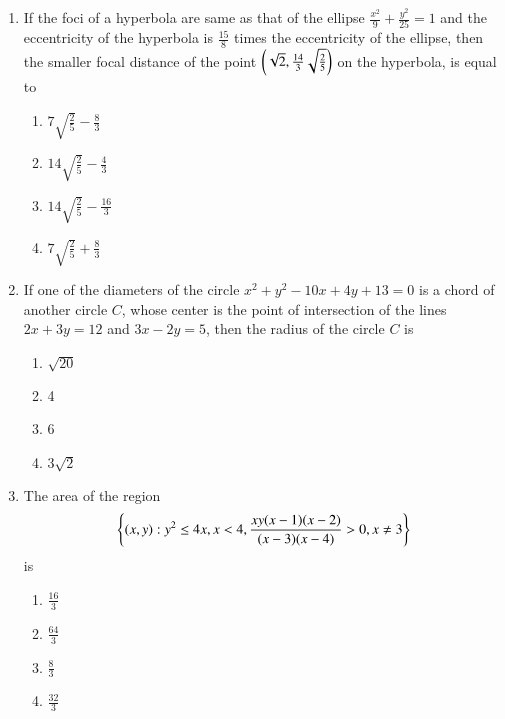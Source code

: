 \documentclass[journal]{IEEEtran}
\begin{document}
\begin{enumerate}
    \item If the foci of a hyperbola are same as that of the ellipse
    $\frac{x^2}{9} + \frac{y^2}{25} = 1$ and the eccentricity of the
    hyperbola is $\frac{15}{8}$ times the eccentricity of the
    ellipse, then the smaller focal distance of the point
    $\left(\sqrt{2}, \frac{14}{3} \sqrt{\frac{2}{5}}\right)$ on the hyperbola,
    is equal to

    \begin{multicols}{4}
\begin{enumerate}

        \item $7\sqrt{\frac{2}{5}} - \frac{8}{3}$
        \item $14\sqrt{\frac{2}{5}} - \frac{4}{3}$
        \item $14\sqrt{\frac{2}{5}} - \frac{16}{3}$
        \item $7\sqrt{\frac{2}{5}} + \frac{8}{3}$
    \end{enumerate}
\end{multicols}

    \item If one of the diameters of the circle $x^2 + y^2 - 10x +
    4y + 13 = 0$ is a chord of another circle $C$, whose
    center is the point of intersection of the lines $2x +
    3y = 12$ and $3x - 2y = 5$, then the radius of the
    circle $C$ is
    
    \begin{multicols}{4}
\begin{enumerate}

        \item $\sqrt{20}$
        \item 4
        \item 6
        \item $3\sqrt{2}$
    \end{enumerate}
\end{multicols}

    \item The area of the region
        \begin{align*}
    \left\{(x,y): y^2\le 4x,x<4,\frac{xy(x-1)(x-2)}{(x-3)(x-4)}>0,x\ne3\right\}
        \end{align*}
    is

    \begin{multicols}{4}
\begin{enumerate}

        \item $\frac{16}{3}$
        \item $\frac{64}{3}$
        \item $\frac{8}{3}$
        \item $\frac{32}{3}$
    \end{enumerate}
\end{multicols}


\end{enumerate}
\end{document}
